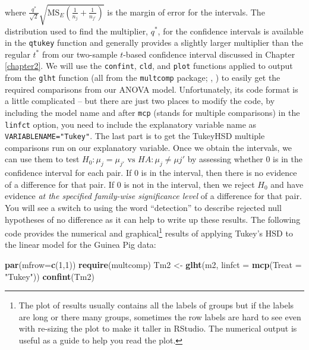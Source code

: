 \documentclass[]{book}
\newenvironment{Shaded}{\begin{snugshade}}{\end{snugshade}}
\newcommand{\KeywordTok}[1]{\textcolor[rgb]{0.13,0.29,0.53}{\textbf{#1}}}
\newcommand{\DataTypeTok}[1]{\textcolor[rgb]{0.13,0.29,0.53}{#1}}
\newcommand{\DecValTok}[1]{\textcolor[rgb]{0.00,0.00,0.81}{#1}}
\newcommand{\StringTok}[1]{\textcolor[rgb]{0.31,0.60,0.02}{#1}}
\newcommand{\NormalTok}[1]{#1}
\let\rmarkdownfootnote\footnote%
\def\footnote{\protect\rmarkdownfootnote}
\theoremstyle{definition}
\theoremstyle{definition}
\theoremstyle{remark}
\begin{document}
where
\(\frac{q^*}{\sqrt{2}}\sqrt{\text{MS}_E\left(\frac{1}{n_j}+ \frac{1}{n_{j'}}\right)}\)
is the margin of error for the intervals. The distribution used to find
the multiplier, \(q^*\), for the confidence intervals is available in
the \texttt{qtukey} function and generally provides a slightly larger
multiplier than the regular \(t^*\) from our two-sample \(t\)-based
confidence interval discussed in Chapter \ref{chapter2}. We will use the
\texttt{confint}, \texttt{cld}, and \texttt{plot} functions applied to
output from the \texttt{glht} function (all from the \texttt{multcomp}
package; \citet{Hothorn2008}, \citep{R-multcomp}) to easily get the
required comparisons from our ANOVA model. Unfortunately, its code
format is a little complicated -- but there are just two places to
modify the code, by including the model name and after \texttt{mcp}
(stands for multiple comparisons) in the \texttt{linfct} option, you
need to include the explanatory variable name as
\texttt{VARIABLENAME="Tukey"}. The last part is to get the TukeyHSD
multiple comparisons run on our explanatory variable. Once we obtain the
intervals, we can use them to test
\(H_0: \mu_j = \mu_{j'} \text{ vs } HA: \mu_j \ne \mu{j'}\) by assessing
whether 0 is in the confidence interval for each pair. If 0 is in the
interval, then there is no evidence of a difference for that pair. If 0
is not in the interval, then we reject \(H_0\) and have evidence
\emph{at the specified family-wise significance level} of a difference
for that pair. You will see a switch to using the word ``detection'' to
describe rejected null hypotheses of no difference as it can help to
write up these results. The following code provides the numerical and
graphical\footnote{The plot of results usually contains all the labels
  of groups but if the labels are long or there many groups, sometimes
  the row labels are hard to see even with re-sizing the plot to make it
  taller in RStudio. The numerical output is useful as a guide to help
  you read the plot.} results of applying Tukey's HSD to the linear
model for the Guinea Pig data:





\begin{Shaded}
\begin{Highlighting}[]
\KeywordTok{par}\NormalTok{(}\DataTypeTok{mfrow=}\KeywordTok{c}\NormalTok{(}\DecValTok{1}\NormalTok{,}\DecValTok{1}\NormalTok{))}
\KeywordTok{require}\NormalTok{(multcomp)}
\NormalTok{Tm2 <-}\StringTok{ }\KeywordTok{glht}\NormalTok{(m2, }\DataTypeTok{linfct =} \KeywordTok{mcp}\NormalTok{(}\DataTypeTok{Treat =} \StringTok{"Tukey"}\NormalTok{))}
\KeywordTok{confint}\NormalTok{(Tm2)}
\end{Highlighting}
\end{Shaded}
\end{document}
